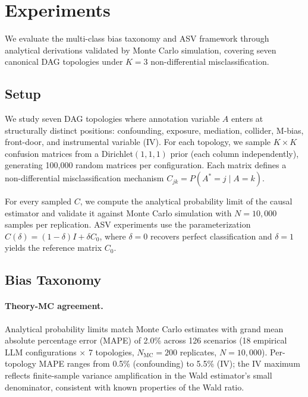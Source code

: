 \section{Experiments}
\label{sec:experiments}

We evaluate the multi-class bias taxonomy and ASV framework through analytical derivations validated by Monte Carlo simulation, covering seven canonical DAG topologies under $K{=}3$ non-differential misclassification.

\subsection{Setup}
\label{sec:setup}

We study seven DAG topologies where annotation variable $A$ enters at structurally distinct positions: confounding, exposure, mediation, collider, M-bias, front-door, and instrumental variable (IV). For each topology, we sample $K{\times}K$ confusion matrices from a Dirichlet$(1,1,1)$ prior (each column independently), generating 100{,}000 random matrices per configuration. Each matrix defines a non-differential misclassification mechanism $C_{jk} = P(A^*{=}j \mid A{=}k)$.

For every sampled $C$, we compute the analytical probability limit of the causal estimator and validate it against Monte Carlo simulation with $N{=}10{,}000$ samples per replication. ASV experiments use the parameterization $C(\delta) = (1{-}\delta)I + \delta C_0$, where $\delta{=}0$ recovers perfect classification and $\delta{=}1$ yields the reference matrix $C_0$.

\subsection{Bias Taxonomy}
\label{sec:taxonomy_results}

\paragraph{Theory-MC agreement.}
Analytical probability limits match Monte Carlo estimates with grand mean absolute percentage error (MAPE) of 2.0\% across 126 scenarios (18 empirical LLM configurations $\times$ 7 topologies, $N_{\text{MC}}{=}200$ replicates, $N{=}10{,}000$). Per-topology MAPE ranges from 0.5\% (confounding) to 5.5\% (IV); the IV maximum reflects finite-sample variance amplification in the Wald estimator's small denominator, consistent with known properties of the Wald ratio.

